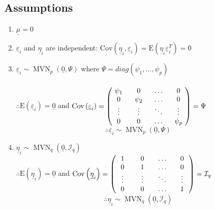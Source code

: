 \documentclass[a4paper,12pt,fleqn]{article}
\numberwithin{equation}{section}
\begin{document}
\subsection[Assumptions]{Assumptions}
\begin{enumerate}
	\item $\underline{\mu}=0$
	\item $\underline{\varepsilon}_i$ and $\underline{\eta}_i$ are independent: $\mathrm{Cov}\left(\underline{\eta}_i,\underline{\varepsilon}_i\right) = \mathrm{E}\left(\underline{\eta}_i\underline{\varepsilon}_i^T\right) = 0$
	\item $\underline{\varepsilon}_i \sim\operatorname{MVN}_p\left(\underline{0},\Psi\right)$ where $\Psi = \textit{diag}\left(\psi_1,\ldots,\psi_p\right)$\\
	\\
	$\therefore \mathrm{E}\left(\underline{\varepsilon}_i\right) = \underline{0}$ and $ \mathrm{Cov}\left(\underline{\varepsilon}_i\right) = \begin{pmatrix}
	\diagentry{\psi_1} & 0 & \ldots & 0\\
	0 & \diagentry{\psi_2}& \ldots & 0\\
	\vdots & \vdots & \diagentry{\ddots}& \vdots\\
	0 & 0 & \ldots & \diagentry{\psi_p}
	\end{pmatrix} = \Psi$
	\begin{equation}
	\label{eq:2}
	\therefore \underline{\varepsilon}_i \sim \operatorname{MVN}_p\left(\underline{0},\Psi\right)
	\end{equation}
	\item $\underline{\eta}_i \sim\operatorname{MVN}_q\left(\underline{0}, \mathcal{I}_q\right)$ 
	\\
	$\therefore \mathrm{E}\left(\underline{\eta}_i\right) = \underline{0}$ and $ \mathrm{Cov}\left(\underline{\eta}_i\right) = \begin{pmatrix}
	\diagentry{1} & 0 & \ldots & 0\\
	0 & \diagentry{1}& \ldots & 0\\
	\vdots & \vdots & \diagentry{\ddots}& \vdots\\
	0 & 0 & \ldots & \diagentry{1}
	\end{pmatrix} = \mathcal{I}_q$
	\begin{equation}
	\label{eq:3}
	\therefore \underline{\eta}_i \sim \operatorname{MVN}_q\left(\underline{0}, \mathcal{I}_q\right)
	\end{equation}
\end{enumerate}
\end{document}
